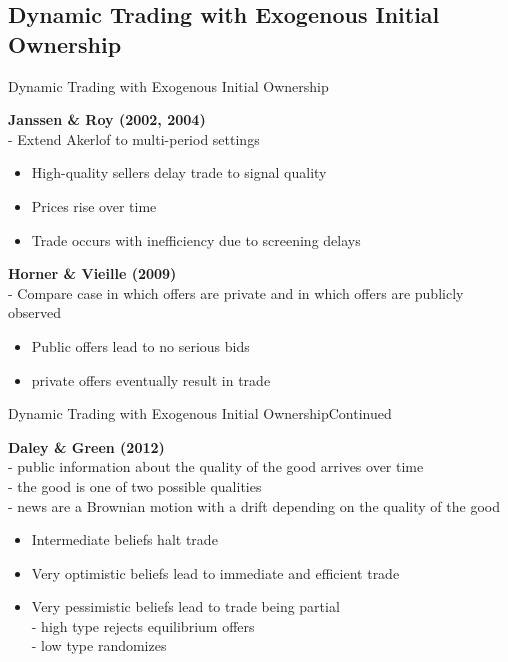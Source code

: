 \documentclass[aspectratio=169]{beamer}  %
\begin{document}
\subsection{Dynamic Trading with Exogenous Initial Ownership}
\begin{frame}{ Dynamic Trading with Exogenous Initial Ownership}{}
\begin{spacing}{1.5}
 
{\small
\textbf{Janssen \& Roy (2002, 2004)} \\
    - Extend Akerlof to multi-period settings \\
\begin{itemize}
    \item High-quality sellers delay trade to signal quality
    \item Prices rise over time
    \item Trade occurs with inefficiency due to screening delays
\end{itemize}
\textbf{Horner \& Vieille (2009)}\\
-  Compare case in which offers are private and in which offers are publicly observed
\begin{itemize}
    \item Public offers lead to no serious bids 
    \item private offers eventually result in trade
\end{itemize}
}
\end{spacing}
\end{frame}

\begin{frame}{Dynamic Trading with Exogenous Initial Ownership}{Continued}
\begin{spacing}{1.5}
 
{\small
\textbf{Daley \& Green (2012)} \\
- public information about the quality of the good arrives over
time \\
-  the good is one of two possible qualities\\
- news are a Brownian motion with a drift depending on the quality of the good
\begin{itemize}
    \item Intermediate beliefs halt trade
    \item Very optimistic beliefs lead to immediate and efficient trade
    \item Very pessimistic beliefs lead to trade being partial\\
    - high type rejects equilibrium offers\\
    - low type randomizes
\end{itemize}
 
}
\end{spacing}
\end{frame}
\end{document}
